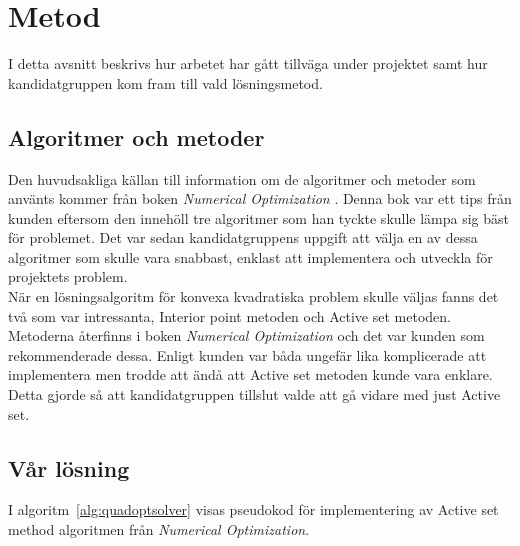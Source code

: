 \section{Metod}
I detta avsnitt beskrivs hur arbetet har gått tillväga under projektet samt hur kandidatgruppen kom fram till vald lösningsmetod. 

\subsection{Algoritmer och metoder} 
\label{sec:algmet}
Den huvudsakliga källan till information om de algoritmer och metoder som använts kommer från boken \emph{Numerical Optimization} \citep{numericaloptimization}. Denna bok var ett tips från kunden eftersom den innehöll tre algoritmer som han tyckte skulle lämpa sig bäst för problemet. Det var sedan kandidatgruppens uppgift att välja en av dessa algoritmer som skulle vara snabbast, enklast att implementera och utveckla för projektets problem.
\\
När en lösningsalgoritm för konvexa kvadratiska problem skulle väljas fanns det två som var intressanta, Interior point metoden och Active set metoden. Metoderna återfinns i boken \emph{Numerical Optimization} \citep{numericaloptimization} och det var kunden som rekommenderade dessa. Enligt kunden var båda ungefär lika komplicerade att implementera men trodde att ändå att Active set metoden kunde vara enklare. Detta gjorde så att kandidatgruppen tillslut valde att gå vidare med just Active set. 
\\
\subsection{Vår lösning}
I algoritm~\ref{alg:quadoptsolver} visas pseudokod för implementering av Active set method algoritmen från \emph{Numerical Optimization}.

